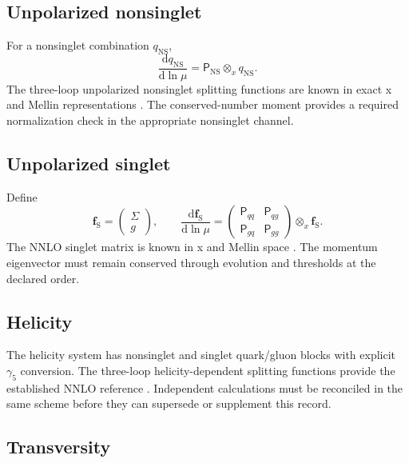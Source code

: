 \documentclass[11pt]{article}
\newcommand{\dd}{\mathrm{d}}
\newcommand{\otimesx}{\mathbin{\otimes_x}}
\newcommand{\NS}{\mathrm{NS}}
\newcommand{\sing}{\mathrm{S}}
\begin{document}
\subsection{Unpolarized nonsinglet}

For a nonsinglet combination \(q_{\NS}\),
\begin{equation}
 \frac{\dd q_{\NS}}{\dd\ln\mu}
 =
 \mathsf P_{\NS}\otimesx q_{\NS}.
 \label{eq:ns-evolution}
\end{equation}
The three-loop unpolarized nonsinglet splitting functions are known in exact x and Mellin representations \cite{MochVermaserenVogt2004NS}.  The conserved-number moment provides a required normalization check in the appropriate nonsinglet channel.

\subsection{Unpolarized singlet}

Define
\begin{equation}
 \bm f_{\sing}=
 \begin{pmatrix}\Sigma\\g\end{pmatrix},
 \qquad
 \frac{\dd\bm f_{\sing}}{\dd\ln\mu}
 =
 \begin{pmatrix}
 \mathsf P_{qq}&\mathsf P_{qg}\\
 \mathsf P_{gq}&\mathsf P_{gg}
 \end{pmatrix}
 \otimesx\bm f_{\sing}.
 \label{eq:singlet-evolution}
\end{equation}
The NNLO singlet matrix is known in x and Mellin space \cite{VogtMochVermaseren2004Singlet}.  The momentum eigenvector must remain conserved through evolution and thresholds at the declared order.

\subsection{Helicity}

The helicity system has nonsinglet and singlet quark/gluon blocks with explicit \(\gamma_5\) conversion.  The three-loop helicity-dependent splitting functions provide the established NNLO reference \cite{MochVermaserenVogt2014}.  Independent calculations must be reconciled in the same scheme before they can supersede or supplement this record.

\subsection{Transversity}
\end{document}
